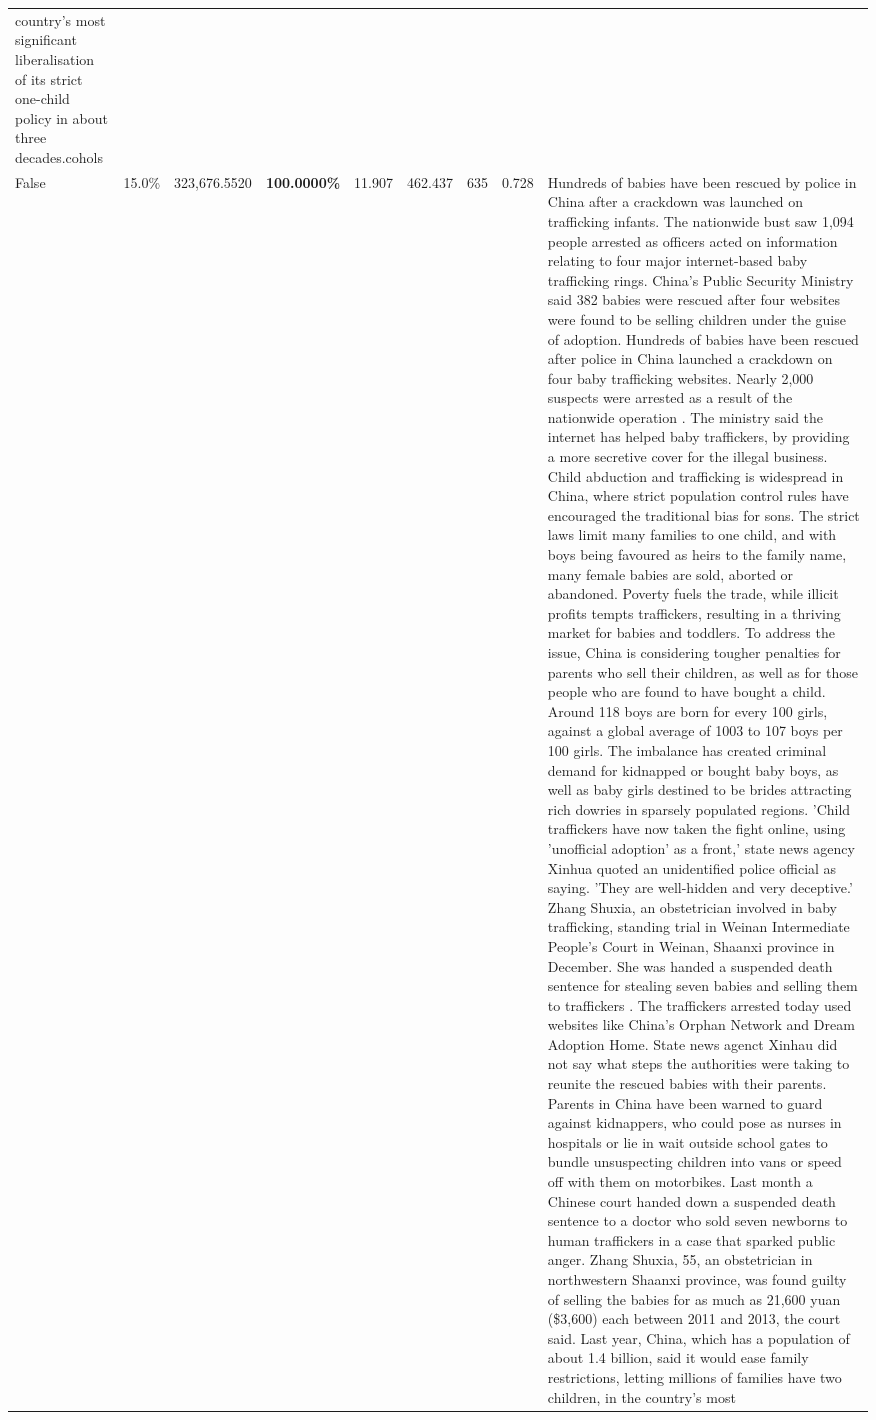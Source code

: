 \begin{table}[H]
\begin{tabular}{lllrlllll}
country's most significant liberalisation of its strict one-child policy in about three decades.cohols \\
\cline{1-9}
False & 15.0\% & 323,676.5520 & \bfseries \color{red} 100.0000\% & 11.907 & 462.437 & 635 & 0.728 & Hundreds of babies have been rescued by police in China after a crackdown was launched on trafficking infants. The nationwide bust saw 1,094 people arrested as officers acted on information relating to four major internet-based baby trafficking rings. China's Public Security Ministry said 382 babies were rescued after four websites were found to be selling children under the guise of adoption. Hundreds of babies have been rescued after police in China launched a crackdown on four baby trafficking websites. Nearly 2,000 suspects were arrested as a result of the nationwide operation . The ministry said the internet has helped baby traffickers, by providing a more secretive cover for the illegal business. Child abduction and trafficking is widespread in China, where strict population control rules have encouraged the traditional bias for sons. The strict laws limit many families to one child, and with boys being favoured as heirs to the family name, many female babies are sold, aborted or abandoned. Poverty fuels the trade, while illicit profits tempts traffickers, resulting in a thriving market for babies and toddlers. To address the issue, China is considering tougher penalties for parents who sell their children, as well as for those people who are found to have bought a child. Around 118 boys are born for every 100 girls, against a global average of 1003 to 107 boys per 100 girls. The imbalance has created criminal demand for kidnapped or bought baby boys, as well as baby girls destined to be brides attracting rich dowries in sparsely populated regions. 'Child traffickers have now taken the fight online, using 'unofficial adoption' as a front,' state news agency Xinhua quoted an unidentified police official as saying. 'They are well-hidden and very deceptive.' Zhang Shuxia, an obstetrician involved in baby trafficking, standing trial in Weinan Intermediate People's Court in Weinan, Shaanxi province in December. She was handed a suspended death sentence for stealing seven babies and selling them to traffickers . The traffickers arrested today used websites like China's Orphan Network and Dream Adoption Home. State news agenct Xinhau did not say what steps the authorities were taking to reunite the rescued babies with their parents. Parents in China have been warned to guard against kidnappers, who could pose as nurses in hospitals or lie in wait outside school gates to bundle unsuspecting children into vans or speed off with them on motorbikes. Last month a Chinese court handed down a suspended death sentence to a doctor who sold seven newborns to human traffickers in a case that sparked public anger. Zhang Shuxia, 55, an obstetrician in northwestern Shaanxi province, was found guilty of selling the babies for as much as 21,600 yuan (\$3,600) each between 2011 and 2013, the court said. Last year, China, which has a population of about 1.4 billion, said it would ease family restrictions, letting millions of families have two children, in the country's most 
\end{tabular}
\end{table}
